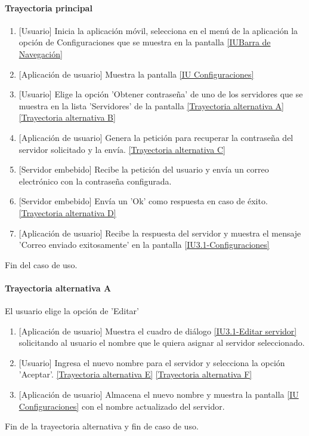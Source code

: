 \paragraph{Trayectoria principal} \label{SUB-U-CU1.9:TP}
	\begin{enumerate}
		\item {[Usuario]} Inicia la aplicación móvil, selecciona en el menú de la aplicación la opción de Configuraciones que se muestra en la pantalla \hyperref[fig:Barra de navegacion]{[IUBarra de Navegación]}
		\item {[Aplicación de usuario]} Muestra la pantalla \hyperref[fig:Configuraciones]{[IU Configuraciones]}
		\item {[Usuario]} Elige la opción 'Obtener contraseña' de uno de los servidores que se muestra en la lista 'Servidores' de la pantalla  \hyperref[SUB-U-CU1.9:TA]{[Trayectoria alternativa A]} \hyperref[SUB-U-CU1.9:TB]{[Trayectoria alternativa B]} 
		\item {[Aplicación de usuario]} Genera la petición para recuperar la contraseña del servidor solicitado y la envía.  \hyperref[SUB-U-CU1.9:TC]{[Trayectoria alternativa C]}
		\item {[Servidor embebido]} Recibe la petición del usuario y envía un correo electrónico con la contraseña configurada. 
		\item {[Servidor embebido]} Envía un 'Ok' como respuesta en caso de éxito. \hyperref[SUB-U-CU1.9:TD]{[Trayectoria alternativa D]}
		\item {[Aplicación de usuario]} Recibe la respuesta del servidor y muestra el mensaje 'Correo enviado exitosamente' en la pantalla \hyperref[fig:Configuraciones]{[IU3.1-Configuraciones]}
	\end{enumerate}
	Fin del caso de uso.

\paragraph{Trayectoria alternativa A} \label{SUB-U-CU1.9:TA}
	El usuario elige la opción de 'Editar'
	\begin{enumerate}[label=A\arabic*.]
		\item {[Aplicación de usuario]} Muestra el cuadro de diálogo \hyperref[fig:Editar servidor]{[IU3.1-Editar servidor]} solicitando al usuario el nombre que le quiera asignar al servidor seleccionado.
		\item {[Usuario]} Ingresa el nuevo nombre para el servidor y selecciona la opción 'Aceptar'. \hyperref[SUB-U-CU1.9:TE]{[Trayectoria alternativa E]} \hyperref[SUB-U-CU1.9:TF]{[Trayectoria alternativa F]}
		\item {[Aplicación de usuario]} Almacena el nuevo nombre y muestra la pantalla \hyperref[fig:Configuraciones]{[IU Configuraciones]} con el nombre actualizado del servidor.
	\end{enumerate}
	Fin de la trayectoria alternativa y fin de caso de uso.
	
